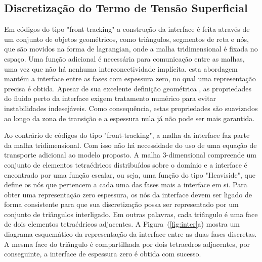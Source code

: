 \documentclass[a4paper,portuges,12pt]{article}
\begin{document}
\subsection{Discretização do Termo de Tensão Superficial}

Em códigos do tipo "front-tracking" a construção da interface é feita
através de um conjunto de objetos geométricos, como triângulos,
segmentos de reta e nós, que são movidos na forma de lagrangian, onde a
malha tridimensional é fixada no espaço. Uma função adicional é necessária
para comunicação entre as malhas, uma vez que não há nenhuma
interconectividade implícita. esta abordagem mantém a interface entre as
fases com espessura zero, no qual uma representação precisa é obtida.
Apesar de sua excelente definição geométrica , as propriedades do fluido
perto da interface exigem tratamento numérico para evitar instabilidades
indesejáveis. Como consequência, estas propriedades são suavizados ao
longo da zona de transição e a espessura nula já não pode ser mais
garantida.

Ao contrário de códigos do tipo "front-tracking", a malha da interface
faz parte da malha tridimensional. Com isso não há necessidade do uso de
uma equação de transporte adicional ao modelo proposto. A malha
3-dimensional compreende um conjunto de elementos tetraédricos
distribuídos sobre o domínio e a interface é encontrado por uma função
escalar, ou seja, uma função do tipo "Heaviside", que define os nós que
pertencem a cada uma das fases mais a interface em si. Para obter uma
representação zero espessura, os nós da interface devem ser ligado de
forma consistente para que sua discretização possa ser representado por
um conjunto de triângulos interligado. Em outras palavras, cada
triângulo é uma face de dois elementos tetraédricos adjacentes. A
Figura~(\ref{fig:inter}a) mostra um diagrama esquemático da
representação da interface entre as duas fases discretas. A mesma face
do triângulo é compartilhada por dois tetraedros adjacentes, por
conseguinte, a interface de espessura zero é obtida com sucesso.
\end{document}
